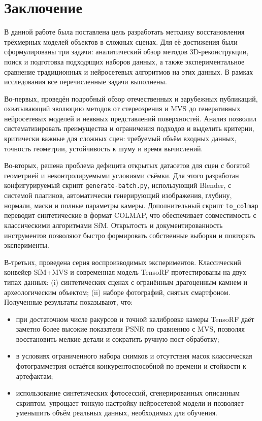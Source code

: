 \chapter{Заключение}

В данной работе была поставлена цель разработать методику восстановления
трёхмерных моделей объектов в сложных сценах. Для её
достижения были сформулированы три задачи: аналитический обзор методов
3D-реконструкции, поиск и подготовка подходящих наборов данных, а также
экспериментальное сравнение традиционных и нейросетевых алгоритмов на этих
данных. В рамках исследования все перечисленные задачи выполнены.

Во‑первых, проведён подробный обзор отечественных и зарубежных публикаций,
охватывающий эволюцию методов от стереозрения и MVS до генеративных нейросетевых
моделей и неявных представлений поверхностей. Анализ позволил систематизировать
преимущества и ограничения подходов и выделить критерии, критически важные для
сложных сцен: требуемый объём входных данных, точность геометрии, устойчивость
к шуму и время вычислений.

Во‑вторых, решена проблема дефицита открытых датасетов для сцен с богатой
геометрией и неконтролируемыми условиями съёмки. Для этого разработан
конфигурируемый скрипт \texttt{generate-batch.py}, использующий Blender, с
системой плагинов, автоматически генерирующий изображения, глубину, нормали,
маски и полные параметры камеры. Дополнительный скрипт \texttt{to\_colmap}
переводит синтетические в формат COLMAP, что обеспечивает совместимость с
классическими алгоритмами SfM. Открытость и документированность инструментов
позволяют быстро формировать собственные выборки и повторять эксперименты.

В‑третьих, проведена серия воспроизводимых экспериментов. Классический конвейер
SfM+MVS и современная модель TensoRF протестированы на двух типах данных: (i)
синтетических сценах с огранённым драгоценным камнем и археологическим
объектом; (ii) наборе фотографий, снятых смартфоном. Полученные результаты
показывают, что:

\begin{itemize}
  \item при достаточном числе ракурсов и точной калибровке камеры TensoRF даёт заметно
  более высокие показатели PSNR по сравнению с MVS, позволяя восстановить
  мелкие детали и сократить ручную пост‑обработку;
  \item в условиях ограниченного набора снимков и отсутствия масок классическая
  фотограмметрия остаётся конкурентоспособной по времени и стойкости
  к артефактам;
  \item использование синтетических фотосессий, сгенерированных описанным скриптом,
  упрощает тонкую настройку нейросетевой модели и позволяет уменьшить объём
  реальных данных, необходимых для обучения.
\end{itemize}

